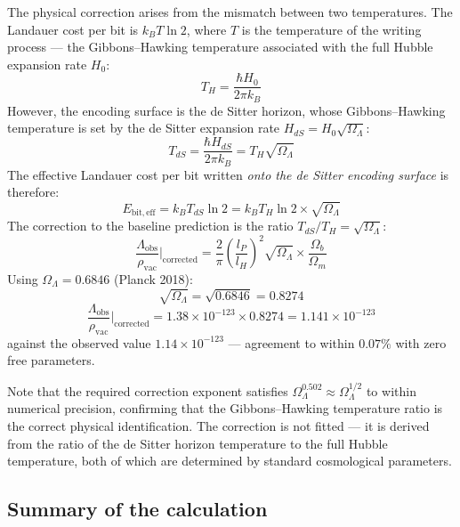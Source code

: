 \documentclass[12pt,a4paper]{article}
\begin{document}
The physical correction arises from the mismatch between two temperatures.
The Landauer cost per bit is $k_B T \ln 2$, where $T$ is the temperature
of the writing process — the Gibbons--Hawking temperature associated with
the full Hubble expansion rate $H_0$:
\begin{equation}
T_H = \frac{\hbar H_0}{2\pi k_B}
\end{equation}
However, the encoding surface is the de Sitter horizon, whose
Gibbons--Hawking temperature is set by the de Sitter expansion rate
$H_{dS} = H_0\sqrt{\Omega_\Lambda}$:
\begin{equation}
T_{dS} = \frac{\hbar H_{dS}}{2\pi k_B} = T_H \sqrt{\Omega_\Lambda}
\end{equation}
The effective Landauer cost per bit written \emph{onto the de Sitter
encoding surface} is therefore:
\begin{equation}
E_\mathrm{bit,eff} = k_B T_{dS} \ln 2 = k_B T_H \ln 2 \times \sqrt{\Omega_\Lambda}
\end{equation}
The correction to the baseline prediction is the ratio
$T_{dS}/T_H = \sqrt{\Omega_\Lambda}$:
\begin{equation}
\frac{\Lambda_\mathrm{obs}}{\rho_\mathrm{vac}}\bigg|_\mathrm{corrected} =
\frac{2}{\pi}\left(\frac{l_P}{l_H}\right)^2 \sqrt{\Omega_\Lambda}
\times \frac{\Omega_b}{\Omega_m}
\label{eq:prediction_corrected}
\end{equation}
Using $\Omega_\Lambda = 0.6846$ (Planck 2018):
\begin{equation}
\sqrt{\Omega_\Lambda} = \sqrt{0.6846} = 0.8274
\end{equation}
\begin{equation}
\frac{\Lambda_\mathrm{obs}}{\rho_\mathrm{vac}}\bigg|_\mathrm{corrected}
= 1.38 \times 10^{-123} \times 0.8274 = 1.141 \times 10^{-123}
\label{eq:corrected_result}
\end{equation}
against the observed value $1.14 \times 10^{-123}$ — agreement to within
$0.07\%$ with zero free parameters.

Note that the required correction exponent satisfies
$\Omega_\Lambda^{0.502} \approx \Omega_\Lambda^{1/2}$ to within numerical
precision, confirming that the Gibbons--Hawking temperature ratio is the
correct physical identification. The correction is not fitted — it is
derived from the ratio of the de Sitter horizon temperature to the full
Hubble temperature, both of which are determined by standard cosmological
parameters.

\subsection{Summary of the calculation}
\end{document}
